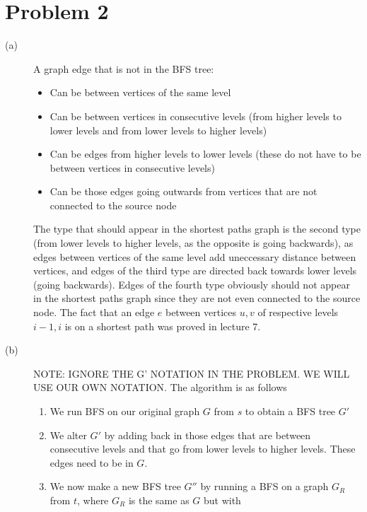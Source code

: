 \documentclass{article}
\begin{document}
\section*{Problem 2}
\begin{description}
    \item[(a)] A graph edge that is not in the BFS tree:
        \begin{itemize}
            \item Can be between vertices of the same level
            \item Can be between vertices in consecutive levels (from
                higher levels to lower levels and from lower levels to higher
                levels)
            \item Can be edges from higher levels to lower levels (these
                do not have to be between vertices in consecutive levels)
            \item Can be those edges going outwards from vertices that are not
                connected to the source node
        \end{itemize}
        The type that should appear in the shortest paths graph is the second
        type (from lower levels to higher levels, as the opposite is going
        backwards), as edges between vertices of the same level add uneccessary
        distance between vertices, and edges of the third type are directed
        back towards lower levels (going backwards). Edges of the fourth type
        obviously should not appear in the shortest paths graph since they
        are not even connected to the source node.
        The fact that an edge $e$
        between vertices $u,v$ of respective levels $i-1,i$ is on a shortest
        path was proved in lecture 7.
    \item[(b)] NOTE: IGNORE THE G' NOTATION IN THE PROBLEM. WE WILL USE
        OUR OWN NOTATION.
        The algorithm is as follows
        \begin{enumerate}
            \item We run BFS on our original graph $G$ from $s$ to obtain
                a BFS tree $G'$
            \item We alter $G'$ by adding back in those edges that are between
                consecutive levels and that go from lower levels to higher
                levels. These edges need to be in $G$.
            \item We now make a new BFS tree $G''$ by running a BFS on a
                graph $G_R$ from $t$, where $G_R$ is the same as $G$ but with

\end{enumerate}
\end{description}
\end{document}
